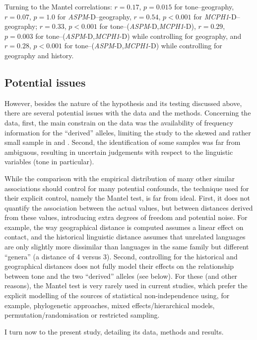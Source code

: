 \documentclass[twoside,onecolumn]{article}
\begin{document}
Turning to the Mantel correlations: $r = 0.17$, $p = 0.015$ for tone--geography, $r = 0.07$, $p = 1.0$ for \textit{ASPM}-D--geography, $r = 0.54$, $p < 0.001$ for \textit{MCPH1}-D--geography; $r = 0.33$, $p < 0.001$ for tone--(\textit{ASPM}-D,\textit{MCPH1}-D), $r = 0.29$, $p = 0.003$ for tone--(\textit{ASPM}-D,\textit{MCPH1}-D) while controlling for geography, and $r = 0.28$, $p < 0.001$ for tone--(\textit{ASPM}-D,\textit{MCPH1}-D) while controlling for geography and history.

\subsection{Potential issues}

However, besides the nature of the hypothesis and its testing discussed above, there are several potential issues with the data and the methods.
Concerning the data, first, the main constrain on the data was the availability of frequency information for the ``derived'' alleles, limiting the study to the skewed and rather small sample in \citet{evans_microcephalin_2005} and \citet{mekelbobrov_aspm_2005}.
Second, the identification of some samples was far from ambiguous, resulting in uncertain judgements with respect to the linguistic variables (tone in particular).

While the comparison with the empirical distribution of many other similar associations should control for many potential confounds, the technique used for their explicit control, namely the Mantel test, is far from ideal.
First, it does not quantify the association between the actual values, but between distances derived from these values, introducing extra degrees of freedom and potential noise.
For example, the way geographical distance is computed assumes a linear effect on contact, and the historical linguistic distance assumes that unrelated languages are only slightly more dissimilar than languages in the same family but different ``genera'' (a distance of 4 versus 3).
Second, controlling for the historical and geographical distances does not fully model their effects on the relationship between tone and the two ``derived'' alleles (see below).
For these (and other reasons), the Mantel test is very rarely used in current studies, which prefer the explicit modelling of the sources of statistical non-independence using, for example, phylogenetic approaches, mixed effects/hierarchical models, permutation/randomisation or restricted sampling.

I turn now to the present study, detailing its data, methods and results.
\end{document}

